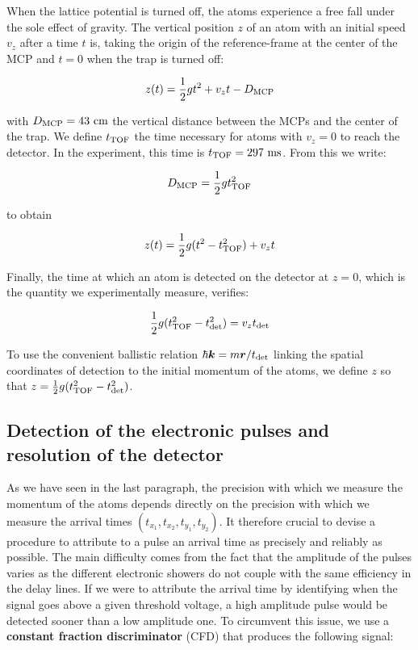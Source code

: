 When the lattice potential is turned off, the atoms experience a free fall under the sole effect of gravity. The vertical position $z$ of an atom with an initial speed $v_z$ after a time $t$ is, taking the origin of the reference-frame at the center of the MCP and $t=0$ when the trap is turned off:

\begin{equation}
    z(t)= \frac{1}{2} gt^2 + v_z t -  D_{\rm{MCP}}
\end{equation}

\noindent with $D_{\rm{MCP}}=43 \ \rm{cm}$ the vertical distance between the MCPs and the center of the trap. We define $t_{\rm{TOF}}$ the time necessary for atoms with $v_z=0$ to reach the detector. In the experiment, this time is $t_{\rm{TOF}}=297 \ \rm{ms}$. From this we write:

\begin{equation}
    D_{\rm{MCP}} = \frac{1}{2} g t_{\rm{TOF}}^2
\end{equation}

\noindent to obtain

\begin{equation}
     z(t)= \frac{1}{2} g(t^2-t_{\rm{TOF}}^2) + v_z t
\end{equation}

\noindent Finally, the time at which an atom is detected on the detector at $z=0$, which is the quantity we experimentally measure, verifies:

\begin{equation}
    \frac{1}{2} g(t_{\rm{TOF}}^2-t_{\rm{det}}^2) = v_z t_{\rm{det}}
\end{equation}

\noindent To use the convenient ballistic relation $\hbar \bm{k} = m \bm{r}/t_{\rm{det}}$ linking the spatial coordinates of detection to the initial momentum of the atoms, we define $z$ so that $z=\frac{1}{2} g(t_{\rm{TOF}}^2-t_{\rm{det}}^2)$.

\subsection{Detection of the electronic pulses and resolution of the detector}

As we have seen in the last paragraph, the precision with which we measure the momentum of the atoms depends directly on the precision with which we measure the arrival times $(t_{x_1},t_{x_2},t_{y_1},t_{y_2})$. It therefore crucial to devise a procedure to attribute to a pulse an arrival time as precisely and reliably as possible. The main difficulty comes from the fact that the amplitude of the pulses varies as the different electronic showers do not couple with the same efficiency in the delay lines. If we were to attribute the arrival time by identifying when the signal goes above a given threshold voltage, a high amplitude pulse would be detected sooner than a low amplitude one. To circumvent this issue, we use a \textbf{constant fraction discriminator} (CFD) that produces the following signal:

